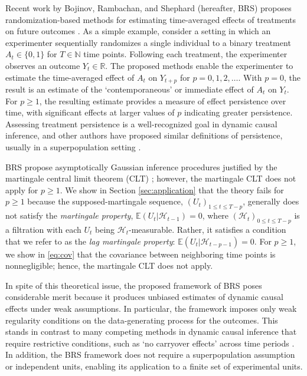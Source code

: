 \documentclass[11pt]{article}
\newcommand{\E}{\mathbb{E}}
\newcommand{\R}{\mathbb{R}}
\newcommand{\N}{\mathbb{N}}
\newcommand{\Hcal}{\mathcal{H}}
\theoremstyle{definition}
\begin{document}
Recent work by Bojinov, Rambachan, and Shephard (hereafter, BRS) proposes randomization-based methods for estimating time-averaged effects of treatments on future outcomes \citep{bojinov_time_2019,bojinov_panel_2021}.
As a simple example, consider a setting in which an experimenter sequentially randomizes a single individual to a binary treatment $A_t \in \{0, 1\}$ for $T \in \N$ time points.
Following each treatment, the experimenter observes an outcome $Y_t \in \R$.
The proposed methods enable the experimenter to estimate the time-averaged effect of $A_t$ on $Y_{t+p}$ for $p = 0, 1, 2, \ldots$.
With $p=0$, the result is an estimate of the `contemporaneous' or immediate effect of $A_t$ on $Y_t$.
For $p \geq 1$, the resulting estimate provides a measure of effect persistence over time, with significant effects at larger values of $p$ indicating greater persistence.
Assessing treatment persistence is a well-recognized goal in dynamic causal inference, and other authors have proposed similar definitions of persistence, usually in a superpopulation setting
\citep{RobinsJamesM.1999EotC,BLACKWELLMATTHEW2018HtMC,Boruvka03072018}.

BRS propose asymptotically Gaussian inference procedures justified by the martingale central limit theorem (CLT) \citep{hall_martingale_1980,hausler_stable_2015};
however, the martingale CLT does not apply for $p \geq 1$.
We show in Section \ref{sec:application} that the theory fails for $p \geq 1$ because the supposed-martingale sequence, $(U_t)_{1 \leq t \leq T-p}$, generally does not satisfy the \emph{martingale property}, $\E(U_t | \Hcal_{t-1}) = 0$, where $(\Hcal_t)_{0 \leq t \leq T-p}$ is a filtration with each $U_t$ being $\Hcal_t$-measurable.
Rather, it satisfies a condition that we refer to as the \emph{lag martingale property}: $\E(U_t | \Hcal_{t-p-1}) = 0$.
For $p \geq 1$, we show in \eqref{eq:cov} that the covariance between neighboring time points is nonnegligible; hence, the martingale CLT does not apply.

In spite of this theoretical issue, the proposed framework of BRS poses considerable merit because it produces unbiased estimates of dynamic causal effects under weak assumptions.
In particular, the framework imposes only weak regularity conditions on the data-generating process for the outcomes.
This stands in contrast to many competing methods in dynamic causal inference that require restrictive conditions, such as `no carryover effects' across time periods \citep{ImaiKosuke2019WSWU,deChaisemartinClément2020TFEE,arkhangelsky2022doubly,ATHEY202262}.
In addition, the BRS framework does not require a superpopulation assumption or independent units, enabling its application to a finite set of experimental units.
\end{document}
